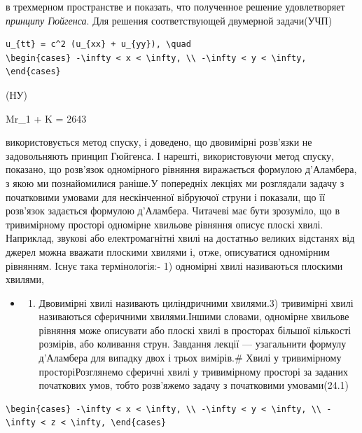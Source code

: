 \documentclass[
  ukrainian,
]{article}
\providecommand{\tightlist}{%
  \setlength{\itemsep}{0pt}\setlength{\parskip}{0pt}}
\begin{document}
в трехмерном пространстве и показать, что полученное решение
удовлетворяет \emph{принципу Гюйгенса}. Для решения соответствующей
двумерной задачи(УЧП)

\begin{verbatim}
u_{tt} = c^2 (u_{xx} + u_{yy}), \quad
\begin{cases} -\infty < x < \infty, \\ -\infty < y < \infty, \end{cases}
\end{verbatim}

(НУ)

Mr\_1 + K = 2643

використовується метод спуску, і доведено, що двовимірні розв'язки не
задовольняють принцип Гюйгенса. І нарешті, використовуючи метод спуску,
показано, що розв'язок одномірного рівняння виражається формулою
д'Аламбера, з якою ми познайомилися раніше.У попередніх лекціях ми
розглядали задачу з початковими умовами для нескінченної вібруючої
струни і показали, що її розв'язок задається формулою д'Аламбера.
Читачеві має бути зрозуміло, що в тривимірному просторі одномірне
хвильове рівняння описує плоскі хвилі. Наприклад, звукові або
електромагнітні хвилі на достатньо великих відстанях від джерел можна
вважати плоскими хвилями і, отже, описуватися одномірним рівнянням.
Існує така термінологія:- 1) одномірні хвилі називаються плоскими
хвилями,

\begin{itemize}
\tightlist
\item
  \begin{enumerate}
  \def\labelenumi{\arabic{enumi})}
  \setcounter{enumi}{1}
  \tightlist
  \item
    Двовимірні хвилі називають циліндричними хвилями.3) тривимірні хвилі
    називаються сферичними хвилями.Іншими словами, одномірне хвильове
    рівняння може описувати або плоскі хвилі в просторах більшої
    кількості розмірів, або коливання струн. Завдання лекції ---
    узагальнити формулу д'Аламбера для випадку двох і трьох вимірів.\#
    Хвилі у тривимірному просторіРозглянемо сферичні хвилі у
    тривимірному просторі за заданих початкових умов, тобто розв'яжемо
    задачу з початковими умовами(24.1)
  \end{enumerate}
\end{itemize}

\begin{verbatim}
\begin{cases} -\infty < x < \infty, \\ -\infty < y < \infty, \\ -\infty < z < \infty, \end{cases}
\end{verbatim}
\end{document}
